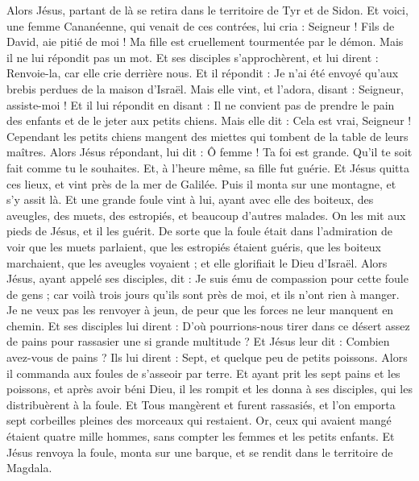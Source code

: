 \begin{multicols}{2}
Alors Jésus, partant de là se retira dans le territoire de Tyr et de Sidon.
Et voici, une femme Cananéenne, qui venait de ces contrées, lui cria : Seigneur ! Fils de David, aie pitié de moi ! Ma fille est cruellement tourmentée par le démon.
Mais il ne lui répondit pas un mot. Et ses disciples s'approchèrent, et lui dirent : Renvoie-la, car elle crie derrière nous.
Et il répondit : Je n’ai été envoyé qu'aux brebis perdues de la maison d'Israël.
Mais elle vint, et l'adora, disant : Seigneur, assiste-moi !
Et il lui répondit en disant : Il ne convient pas de prendre le pain des enfants et de le jeter aux petits chiens.
Mais elle dit : Cela est vrai, Seigneur ! Cependant les petits chiens mangent des miettes qui tombent de la table de leurs maîtres.
Alors Jésus répondant, lui dit : Ô femme ! Ta foi est grande. Qu'il te soit fait comme tu le souhaites. Et, à l’heure même, sa fille fut guérie.
Et Jésus quitta ces lieux, et vint près de la mer de Galilée. Puis il monta sur une montagne, et s’y assit là.
Et une grande foule vint à lui, ayant avec elle des boiteux, des aveugles, des muets, des estropiés, et beaucoup d’autres malades. On les mit aux pieds de Jésus, et il les guérit.
De sorte que la foule était dans l’admiration de voir que les muets parlaient, que les estropiés étaient guéris, que les boiteux marchaient, que les aveugles voyaient ; et elle glorifiait le Dieu d'Israël.
Alors Jésus, ayant appelé ses disciples, dit : Je suis ému de compassion pour cette foule de gens ; car voilà trois jours qu'ils sont près de moi, et ils n'ont rien à manger. Je ne veux pas les renvoyer à jeun, de peur que les forces ne leur manquent en chemin.
Et ses disciples lui dirent : D’où pourrions-nous tirer dans ce désert assez de pains pour rassasier une si grande multitude ?
Et Jésus leur dit : Combien avez-vous de pains ? Ils lui dirent : Sept, et quelque peu de petits poissons.
Alors il commanda aux foules de s'asseoir par terre.
Et ayant prit les sept pains et les poissons, et après avoir béni Dieu, il les rompit et les donna à ses disciples, qui les distribuèrent à la foule.
Et Tous mangèrent et furent rassasiés, et l’on emporta sept corbeilles pleines des morceaux qui restaient.
Or, ceux qui avaient mangé étaient quatre mille hommes, sans compter les femmes et les petits enfants.
Et Jésus renvoya la foule, monta sur une barque, et se rendit dans le territoire de Magdala.

\end{multicols}
